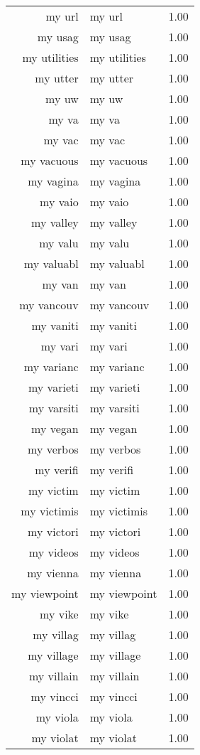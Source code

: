 \begin{table}[ht]
\begin{tabular}{rlr}
  my url & my url & 1.00 \\ 
  my usag & my usag & 1.00 \\ 
  my utilities & my utilities & 1.00 \\ 
  my utter & my utter & 1.00 \\ 
  my uw & my uw & 1.00 \\ 
  my va & my va & 1.00 \\ 
  my vac & my vac & 1.00 \\ 
  my vacuous & my vacuous & 1.00 \\ 
  my vagina & my vagina & 1.00 \\ 
  my vaio & my vaio & 1.00 \\ 
  my valley & my valley & 1.00 \\ 
  my valu & my valu & 1.00 \\ 
  my valuabl & my valuabl & 1.00 \\ 
  my van & my van & 1.00 \\ 
  my vancouv & my vancouv & 1.00 \\ 
  my vaniti & my vaniti & 1.00 \\ 
  my vari & my vari & 1.00 \\ 
  my varianc & my varianc & 1.00 \\ 
  my varieti & my varieti & 1.00 \\ 
  my varsiti & my varsiti & 1.00 \\ 
  my vegan & my vegan & 1.00 \\ 
  my verbos & my verbos & 1.00 \\ 
  my verifi & my verifi & 1.00 \\ 
  my victim & my victim & 1.00 \\ 
  my victimis & my victimis & 1.00 \\ 
  my victori & my victori & 1.00 \\ 
  my videos & my videos & 1.00 \\ 
  my vienna & my vienna & 1.00 \\ 
  my viewpoint & my viewpoint & 1.00 \\ 
  my vike & my vike & 1.00 \\ 
  my villag & my villag & 1.00 \\ 
  my village & my village & 1.00 \\ 
  my villain & my villain & 1.00 \\ 
  my vincci & my vincci & 1.00 \\ 
  my viola & my viola & 1.00 \\ 
  my violat & my violat & 1.00 \\ 

\end{tabular}
\end{table}
